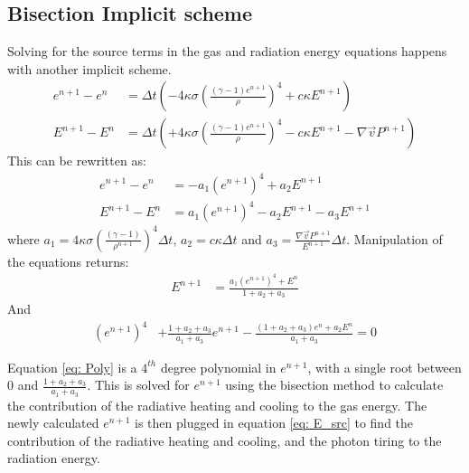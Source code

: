 \subsection{Bisection Implicit scheme} \label{subsection: BIS}
Solving for the source terms in the gas and radiation energy equations happens with another implicit scheme. 
\begin{align}
e^{n+1} - e^n &= \Delta t \left( -4\kappa \sigma \left(\frac{(\gamma - 1)e^{n+1}}{\rho}\right)^4 + c \kappa E^{n+1} \right) \\ 
E^{n+1} - E^n &= \Delta t \left( +4\kappa \sigma \left(\frac{(\gamma - 1)e^{n+1}}{\rho}\right)^4 - c \kappa E^{n+1} -\nabla \vec{v} P^{n+1} \right)
\end{align} 
This can be rewritten as:
\begin{align}
e^{n+1} - e^n &= -a_1 \left( e^{n+1}\right)^4 + a_2 E^{n+1}  \\ 
E^{n+1} - E^n &= a_1 \left( e^{n+1} \right)^4 - a_2 E^{n+1} - a_3 E^{n+1} 
\end{align}
where $a_1 = 4\kappa \sigma \left(\frac{(\gamma - 1)}{\rho^{n+1}}\right)^4 \Delta t$, $a_2 = c \kappa \Delta t$ and $a_3 = \frac{\nabla \vec{v} P^{n+1} }{E^{n+1}} \Delta t$. Manipulation of the equations returns:
\begin{align}
E^{n+1} &= \frac{a_1 \left( e^{n+1} \right)^4 + E^n}{1 + a_2 + a_3} \label{eq: E_src}
\end{align}
And
\begin{align}
\left( e^{n+1} \right)^4 &+ \frac{1 + a_2 + a_3}{a_1 + a_3}e^{n+1} -  \frac{(1 + a_2 + a_3)e^n + a_2 E^n}{a_1 + a_3} = 0 \label{eq: Poly}
\end{align}

Equation \eqref{eq: Poly} is a $4^{th}$ degree polynomial in $e^{n+1}$, with a single root between $0$ and $\frac{1 + a_2 + a_3}{a_1 + a_3}$. This is solved for $e^{n+1}$ using the bisection method to calculate the contribution of the radiative heating and cooling to the gas energy. The newly calculated $e^{n+1}$ is then plugged in equation \eqref{eq: E_src} to find the contribution of the radiative heating and cooling, and the photon tiring to the radiation energy.

